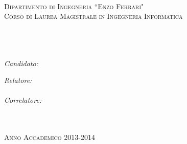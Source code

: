 \documentclass[11pt, oneside]{Thesis} %
\begin{document}
\begin{titlepage}

\begin{center}
\textsc{\Large \bf \univname}\\[0.5cm] %
\textsc{\large Dipartimento di Ingegneria ``Enzo Ferrari"}\\[0.2cm] %
\textsc{\large Corso di Laurea Magistrale in Ingegneria Informatica}\\[5.5cm] %

\HRule \\[0.4cm] %
{\huge \bfseries \ttitle}\\[0.4cm] %
\HRule \\[1.5cm] %
 
\begin{minipage}{0.4\textwidth}
\begin{flushleft} \large
\emph{Candidato:}\\
\authornames %
\end{flushleft}
\end{minipage}
\begin{minipage}{0.4\textwidth}
\begin{flushright} \large
\emph{Relatore:} \\
\supname \\ %
\emph{Correlatore:} \\
\cosupname \\ %
\end{flushright}
\end{minipage}\\[7.5cm]
 
 
\textsc{\large Anno Accademico 2013-2014}\\[4cm] %
 
\vfill
\end{center}

\end{titlepage}
\end{document}
